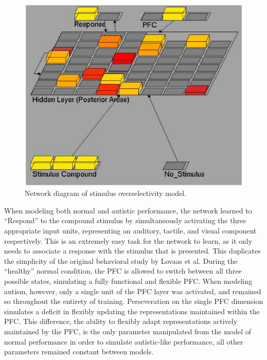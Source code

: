 \documentclass[man]{apa}
\begin{document}
\begin{figure}
\begin{center}
	\includegraphics[width=125mm]{figures/overselectivity_network.ps}
\end{center}
\caption{Network diagram of stimulus overselectivity model.} 
\label{network-diagram-2}
\end{figure}



When modeling both normal and autistic performance, the network learned to ``Respond'' to the compound stimulus by simultaneously activating the three appropriate input units, representing an auditory, tactile, and visual component respectively.  This is an extremely easy task for the network to learn, as it only needs to associate a response with the stimulus that is presented.  This duplicates the simplicity of the original behavioral study by Lovaas et al.  During the ``healthy'' normal condition, the PFC is allowed to switch between all three possible states, simulating a fully functional and flexible PFC.  When modeling autism, however, only a single unit of the PFC layer was activated, and remained so throughout the entirety of training.   Perseveration on the single PFC dimension simulates a deficit in flexibly updating the representations maintained within the PFC.  This difference, the ability to flexibly adapt representations actively maintained by the PFC, is the only parameter manipulated from the model of normal performance in order to simulate autistic-like performance, all other parameters remained constant between models.
\end{document}
